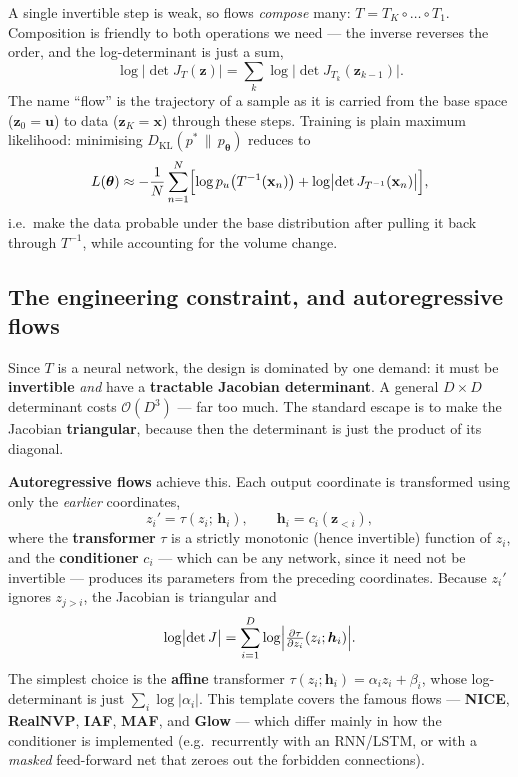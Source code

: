 \documentclass[11pt, oneside]{book}
\newcommand{\KL}[2]{D_{\mathrm{KL}}\!\left(#1 \,\|\, #2\right)}
\newcommand{\params}{\boldsymbol{\theta}}
\newcommand{\xvec}{\mathbf{x}}
\newcommand{\bigO}[1]{\mathcal{O}\!\left(#1\right)}
\begin{document}
A single invertible step is weak, so flows \emph{compose} many: $T = T_K \circ
\dots \circ T_1$. Composition is friendly to both operations we need --- the
inverse reverses the order, and the log-determinant is just a sum,
\[
  \log\bigl|\det J_T(\boldsymbol{z})\bigr|
  = \sum_{k} \log\bigl|\det J_{T_k}(\boldsymbol{z}_{k-1})\bigr|.
\]
The name ``flow'' is the trajectory of a sample as it is carried from the base
space ($\boldsymbol{z}_0 = \boldsymbol{u}$) to data ($\boldsymbol{z}_K = \xvec$)
through these steps. Training is plain maximum likelihood: minimising
$\KL{p^*}{p_{\params}}$ reduces to
\[
  L(\params) \approx -\frac1N \sum_{n=1}^{N}
    \Bigl[\log p_u\bigl(T^{-1}(\xvec_n)\bigr)
          + \log\bigl|\det J_{T^{-1}}(\xvec_n)\bigr|\Bigr],
\]
i.e.\ make the data probable under the base distribution after pulling it back
through $T^{-1}$, while accounting for the volume change.

\subsection{The engineering constraint, and autoregressive flows}

Since $T$ is a neural network, the design is dominated by one demand: it must be
\textbf{invertible} \emph{and} have a \textbf{tractable Jacobian determinant}. A
general $D\times D$ determinant costs $\bigO{D^3}$ --- far too much. The standard
escape is to make the Jacobian \textbf{triangular}, because then the determinant is
just the product of its diagonal.

\textbf{Autoregressive flows} achieve this. Each output coordinate is transformed
using only the \emph{earlier} coordinates,
\[
  z_i' = \tau(z_i;\, \boldsymbol{h}_i), \qquad \boldsymbol{h}_i = c_i(\boldsymbol{z}_{<i}),
\]
where the \textbf{transformer} $\tau$ is a strictly monotonic (hence invertible)
function of $z_i$, and the \textbf{conditioner} $c_i$ --- which can be any network,
since it need not be invertible --- produces its parameters from the preceding
coordinates. Because $z_i'$ ignores $z_{j>i}$, the Jacobian is triangular and
\[
  \log\bigl|\det J\bigr| = \sum_{i=1}^{D} \log\Bigl|\tfrac{\partial \tau}{\partial z_i}(z_i;\boldsymbol{h}_i)\Bigr|.
\]
The simplest choice is the \textbf{affine} transformer $\tau(z_i;\boldsymbol{h}_i)
= \alpha_i z_i + \beta_i$, whose log-determinant is just $\sum_i \log|\alpha_i|$.
This template covers the famous flows --- \textbf{NICE}, \textbf{RealNVP},
\textbf{IAF}, \textbf{MAF}, and \textbf{Glow} --- which differ mainly in how the
conditioner is implemented (e.g.\ recurrently with an RNN/LSTM, or with a
\emph{masked} feed-forward net that zeroes out the forbidden connections).
\end{document}
